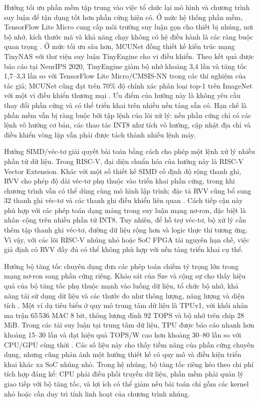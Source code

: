\documentclass[../DoAn.tex]{subfiles}
\begin{document}
Hướng tối ưu phần mềm tập trung vào việc tổ chức lại mô hình và chương trình suy luận để tận dụng tốt hơn phần cứng hiện có. Ở mức hệ thống phần mềm, TensorFlow Lite Micro cung cấp môi trường suy luận gọn cho thiết bị nhúng, nơi bộ nhớ, kích thước mã và khả năng chạy không có hệ điều hành là các ràng buộc quan trọng \cite{david2021tflm}. Ở mức tối ưu sâu hơn, MCUNet đồng thiết kế kiến trúc mạng TinyNAS với thư viện suy luận TinyEngine cho vi điều khiển. Theo kết quả được báo cáo tại NeurIPS 2020, TinyEngine giảm bộ nhớ khoảng 3,4 lần và tăng tốc 1,7--3,3 lần so với TensorFlow Lite Micro/CMSIS-NN trong các thí nghiệm của tác giả; MCUNet cũng đạt trên 70\% độ chính xác phân loại top-1 trên ImageNet với một vi điều khiển thương mại \cite{lin2020mcunet}. Ưu điểm của hướng này là không yêu cầu thay đổi phần cứng và có thể triển khai trên nhiều nền tảng sẵn có. Hạn chế là phần mềm vẫn bị ràng buộc bởi tập lệnh của lõi xử lý: nếu phần cứng chỉ có các lệnh vô hướng cơ bản, các thao tác INT8 như tích vô hướng, cập nhật địa chỉ và điều khiển vòng lặp vẫn phải được tách thành nhiều lệnh máy.

Hướng SIMD/véc-tơ giải quyết bài toán bằng cách cho phép một lệnh xử lý nhiều phần tử dữ liệu. Trong RISC-V, đại diện chuẩn hóa của hướng này là RISC-V Vector Extension. Khác với một số thiết kế SIMD cố định độ rộng thanh ghi, RVV cho phép độ dài véc-tơ phụ thuộc vào triển khai phần cứng, trong khi chương trình vẫn có thể dùng cùng mô hình lập trình; đặc tả RVV cũng bổ sung 32 thanh ghi véc-tơ và các thanh ghi điều khiển liên quan \cite{riscv_unpriv_2026}. Cách tiếp cận này phù hợp với các phép toán dạng mảng trong suy luận mạng nơ-ron, đặc biệt là nhân--cộng trên nhiều phần tử INT8. Tuy nhiên, để hỗ trợ véc-tơ, bộ xử lý cần thêm tập thanh ghi véc-tơ, đường dữ liệu rộng hơn và logic thực thi tương ứng. Vì vậy, với các lõi RISC-V nhúng nhỏ hoặc SoC FPGA tài nguyên hạn chế, việc giả định có RVV đầy đủ có thể không phù hợp với nền tảng triển khai cụ thể.

Hướng bộ tăng tốc chuyên dụng đưa các phép toán chiếm tỷ trọng lớn trong mạng nơ-ron sang phần cứng riêng. Khảo sát của Sze và cộng sự cho thấy hiệu quả của bộ tăng tốc phụ thuộc mạnh vào luồng dữ liệu, tổ chức bộ nhớ, khả năng tái sử dụng dữ liệu và các thước đo như thông lượng, năng lượng và diện tích \cite{sze2017efficient}. Một ví dụ tiêu biểu ở quy mô trung tâm dữ liệu là TPUv1, với khối nhân ma trận 65\,536 MAC 8 bit, thông lượng đỉnh 92 TOPS và bộ nhớ trên chip 28 MiB. Trong các tải suy luận tại trung tâm dữ liệu, TPU được báo cáo nhanh hơn khoảng 15--30 lần và đạt hiệu quả TOPS/W cao hơn khoảng 30--80 lần so với CPU/GPU cùng thời \cite{jouppi2017tpu}. Các số liệu này cho thấy tiềm năng của phần cứng chuyên dụng, nhưng cũng phản ánh một hướng thiết kế có quy mô và điều kiện triển khai khác xa SoC nhúng nhỏ. Trong hệ nhúng, bộ tăng tốc riêng kéo theo chi phí tích hợp đáng kể: CPU phải điều phối truyền dữ liệu, phần mềm phải quản lý giao tiếp với bộ tăng tốc, và lợi ích có thể giảm nếu bài toán chỉ gồm các kernel nhỏ hoặc cần duy trì tính linh hoạt của chương trình nhúng.
\end{document}
